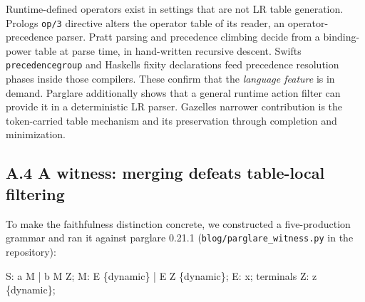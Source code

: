 \documentclass[
  10pt,
]{article}
\newenvironment{Shaded}{}{}
\newcommand{\NormalTok}[1]{#1}
\begin{document}
Runtime-defined operators exist in settings that are not LR table
generation. Prolog\textquotesingle s \texttt{op/3} directive alters the
operator table of its reader, an operator-precedence parser. Pratt
parsing and precedence climbing decide from a binding-power table at
parse time, in hand-written recursive descent. Swift\textquotesingle s
\texttt{precedencegroup} and Haskell\textquotesingle s fixity
declarations feed precedence resolution phases inside those compilers.
These confirm that the \emph{language feature} is in demand. Parglare
additionally shows that a general runtime action filter can provide it
in a deterministic LR parser. Gazelle\textquotesingle s narrower
contribution is the token-carried table mechanism and its preservation
through completion and minimization.

\hypertarget{a4-a-witness-merging-defeats-table-local-filtering}{%
\subsection{A.4 A witness: merging defeats table-local
filtering}\label{a4-a-witness-merging-defeats-table-local-filtering}}

To make the faithfulness distinction concrete, we constructed a
five-production grammar and ran it against parglare 0.21.1
(\texttt{blog/parglare\_witness.py} in the repository):

\begin{Shaded}
\begin{Highlighting}[]
\NormalTok{S: \textquotesingle{}a\textquotesingle{} M | \textquotesingle{}b\textquotesingle{} M Z;}
\NormalTok{M: E \{dynamic\} | E Z \{dynamic\};}
\NormalTok{E: \textquotesingle{}x\textquotesingle{};}
\NormalTok{terminals Z: \textquotesingle{}z\textquotesingle{} \{dynamic\};}
\end{Highlighting}
\end{Shaded}
\end{document}
